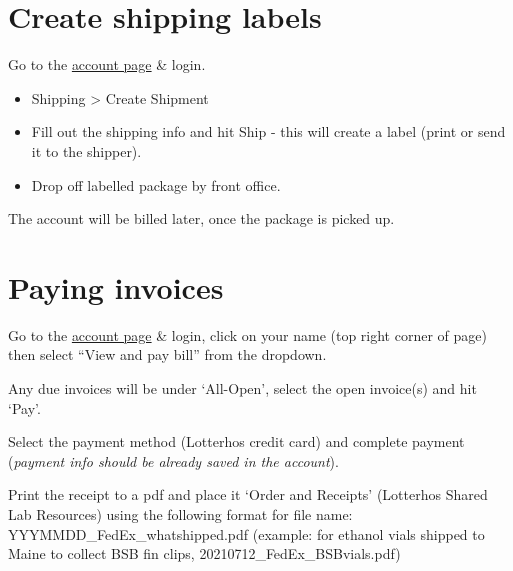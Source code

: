 \documentclass[
  letterpaper,
  DIV=11,
  numbers=noendperiod]{scrreprt}
\begin{document}
\hypertarget{create-shipping-labels}{%
\section*{\texorpdfstring{\textbf{Create shipping
labels}}{Create shipping labels}}\label{create-shipping-labels}}


Go to the
\href{https://www.fedex.com/shipping/shipEntryAction.do?method=doEntry\&link=1\&locale=en_US\&urlparams=us\&sType=FShipping}{account
page} \& login.

\begin{itemize}
\item
  Shipping \textgreater{} Create Shipment
\item
  Fill out the shipping info and hit Ship - this will create a label
  (print or send it to the shipper).
\item
  Drop off labelled package by front office.
\end{itemize}

The account will be billed later, once the package is picked up.

\hypertarget{paying-invoices}{%
\section*{\texorpdfstring{\textbf{Paying
invoices}}{Paying invoices}}\label{paying-invoices}}


Go to the \href{https://www.fedex.com/en-us/home.html}{account page} \&
login, click on your name (top right corner of page) then select ``View
and pay bill'' from the dropdown.

Any due invoices will be under `All-Open', select the open invoice(s)
and hit `Pay'.

Select the payment method (Lotterhos credit card) and complete payment
(\emph{payment info should be already saved in the account}).

Print the receipt to a pdf and place it `Order and Receipts' (Lotterhos
Shared Lab Resources) using the following format for file name:
YYYMMDD\_FedEx\_whatshipped.pdf (example: for ethanol vials shipped to
Maine to collect BSB fin clips, 20210712\_FedEx\_BSBvials.pdf)\\
\end{document}
